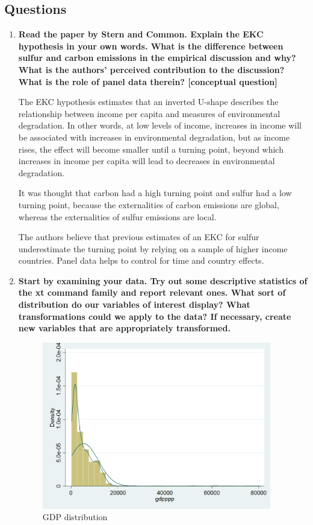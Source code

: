 \documentclass{scrartcl}
\begin{document}
	\subsection*{Questions}
	
	\begin{enumerate}
	\item \textbf{Read the paper by Stern and Common. Explain the EKC hypothesis in your own words. What is the difference between sulfur and carbon emissions in the empirical discussion and why? What is the authors' perceived contribution to the discussion? What is the role of panel data therein? [conceptual question]}
	
	The EKC hypothesis estimates that an inverted U-shape describes the relationship between income per capita and measures of environmental degradation. In other words, at low levels of income, increases in income will be associated with increases in environmental degradation, but as income rises, the effect will become smaller until a turning point, beyond which increases in income per capita will lead to decreases in environmental degradation.
	
	It was thought that carbon had a high turning point and sulfur had a low turning point, because the externalities of carbon emissions are global, whereas the externalities of sulfur emissions are local.
	
	The authors believe that previous estimates of an EKC for sulfur underestimate the turning point by relying on a sample of higher income countries. Panel data helps to control for time and country effects.
		
	\item \textbf{Start by examining your data. Try out some descriptive statistics of the xt command family and report relevant ones. What sort of distribution do our variables of interest display? What transformations could we apply to the data? If necessary, create new variables that are appropriately transformed.}
	
	

	\begin{figure}
      \includegraphics[width=10cm]{../stata/hist_gdp.png}
      \caption{GDP distribution}
    \end{figure}


\end{enumerate}
\end{document}
